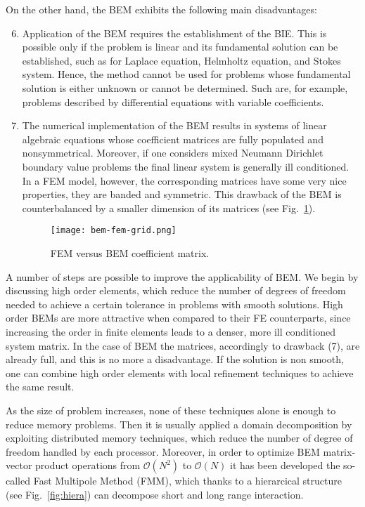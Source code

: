 On the other hand, the BEM exhibits the following main disadvantages:
\begin{enumerate}
\setcounter{enumi}{5}
  \item Application of the BEM requires the establishment of the BIE. This is possible only if the problem is linear and its fundamental solution can be established, such as for Laplace equation, Helmholtz equation, and Stokes system. Hence, the method cannot be used for problems whose fundamental solution is either unknown or cannot be determined. Such are, for example, problems described by differential equations with variable coefficients.

  \item The numerical implementation of the BEM results in systems of linear algebraic equations whose coefficient matrices are fully populated and nonsymmetrical. Moreover, if one considers mixed Neumann Dirichlet boundary value problems the final linear system is generally ill conditioned. In a FEM model, however, the corresponding matrices have some very nice properties, they are banded and symmetric. This drawback of the BEM is counterbalanced by a smaller dimension of its matrices (see Fig.~\ref{fig:bem-fem-grid}).

  \begin{figure}
  \begin{centering}
    \texttt{[image: bem-fem-grid.png]}
    \caption{FEM versus BEM coefficient matrix.}
    \label{fig:bem-fem-grid}
  \end{centering}
  \end{figure}
\end{enumerate}

A number of steps are possible to improve the applicability of BEM. We begin by discussing high order elements, which reduce the number of degrees of freedom needed to achieve a certain tolerance in problems with smooth solutions. High order BEMs are more attractive when compared to their FE counterparts, since increasing the order in finite elements leads to a denser, more ill conditioned system matrix. In the case of BEM the matrices, accordingly to drawback (7), are already full, and this is no more a disadvantage. If the solution is non smooth, one can combine high order elements with local refinement techniques to achieve the same result.

As the size of problem increases, none of these techniques alone is enough to reduce memory problems. Then it is usually applied a domain decomposition by exploiting distributed memory techniques, which reduce the number of degree of freedom handled by each processor. Moreover, in order to optimize BEM matrix-vector product operations from $\mathcal{O}(N^2)$ to $\mathcal{O}(N)$ it has been developed the so-called Fast Multipole Method (FMM), which thanks to a hierarcical structure (see Fig.~\ref{fig:hiera}) can decompose short and long range interaction. 

